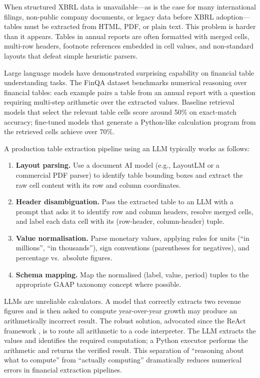 When structured XBRL data is unavailable---as is the case for many international filings,
non-public company documents, or legacy data before XBRL adoption---tables must be
extracted from HTML, PDF, or plain text. This problem is harder than it appears. Tables
in annual reports are often formatted with merged cells, multi-row headers, footnote
references embedded in cell values, and non-standard layouts that defeat simple
heuristic parsers.

Large language models have demonstrated surprising capability on financial table
understanding tasks. The FinQA dataset \citep{chen2021finqa} benchmarks numerical
reasoning over financial tables: each example pairs a table from an annual report with a
question requiring multi-step arithmetic over the extracted values. Baseline retrieval
models that select the relevant table cells score around 50\% on exact-match accuracy;
fine-tuned models that generate a Python-like calculation program from the retrieved
cells achieve over 70\%.

A production table extraction pipeline using an LLM typically works as follows:

\begin{enumerate}
  \item \textbf{Layout parsing.} Use a document AI model (e.g., LayoutLM or a commercial
        PDF parser) to identify table bounding boxes and extract the raw cell content with
        its row and column coordinates.
  \item \textbf{Header disambiguation.} Pass the extracted table to an LLM with a prompt
        that asks it to identify row and column headers, resolve merged cells, and label
        each data cell with its (row-header, column-header) tuple.
  \item \textbf{Value normalisation.} Parse monetary values, applying rules for
        units (``in millions'', ``in thousands''), sign conventions (parentheses for
        negatives), and percentage vs.\ absolute figures.
  \item \textbf{Schema mapping.} Map the normalised (label, value, period) tuples to the
        appropriate GAAP taxonomy concept where possible.
\end{enumerate}

\begin{remark}
LLMs are unreliable calculators. A model that correctly extracts two revenue figures and
is then asked to compute year-over-year growth may produce an arithmetically incorrect
result. The robust solution, advocated since the ReAct framework \citep{yao2022react},
is to route all arithmetic to a code interpreter. The LLM extracts the values and
identifies the required computation; a Python executor performs the arithmetic and returns
the verified result. This separation of ``reasoning about what to compute'' from ``actually
computing'' dramatically reduces numerical errors in financial extraction pipelines.
\end{remark}

